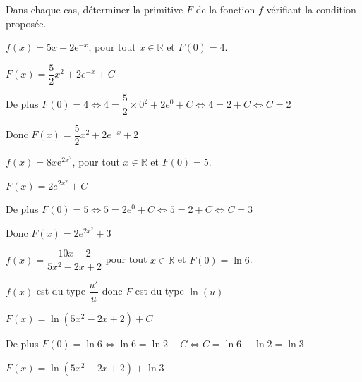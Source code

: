 \documentclass[11pt,a4paper]{article}  %
\begin{document}
\vspace*{-1cm}

Dans chaque cas, déterminer la primitive $F$ de la fonction $f$ vérifiant la condition proposée.
	\begin{enumMet}
		\item $f(x)=5 x-2\mathrm{e}^{-x}$, pour tout $x \in \mathbb{R}$ et $F(0)=4$.
		\begin{corrBox}
			$F(x)=\dfrac{5}{2}x^2+2e^{-x}+C$
			
			De plus $F(0)=4 \iff 4=\dfrac{5}{2}\times 0^2+2e^{0}+C\iff 4=2+C\iff C=2$
			
			Donc $F(x)=\dfrac{5}{2}x^2+2e^{-x}+2$
		\end{corrBox}
		\item $f(x)=8x \mathrm{e}^{2x^2}$, pour tout $x \in \mathbb{R}$ et $F(0)=5$.
		\begin{corrBox}
				$F(x)=2e^{2x^2}+C$
				
				De plus $F(0)=5 \iff 5=2e^{0}+C\iff 5=2+C\iff C=3$
				
				Donc $F(x)=2e^{2x^2}+3$
		\end{corrBox}
		\item $f(x)=\dfrac{10x-2}{5 x^2-2x+2}$ pour tout $x \in \mathbb{R}$ et $F(0)=\ln 6$.
		\begin{corrBox}
			$f(x)$ est du type $\dfrac{u'}{u}$ donc $F$ est du type $\ln(u)$
			
			$F(x)=\ln(5x^2-2x+2)+C$
			
			De plus $F(0)=\ln 6 \iff \ln 6=\ln 2+C\iff C=\ln 6 - \ln 2 = \ln 3$		
			
			$F(x)=\ln(5x^2-2x+2)+\ln 3$
		\end{corrBox}
	\end{enumMet}

\vspace*{-0.8cm}
\end{document}

